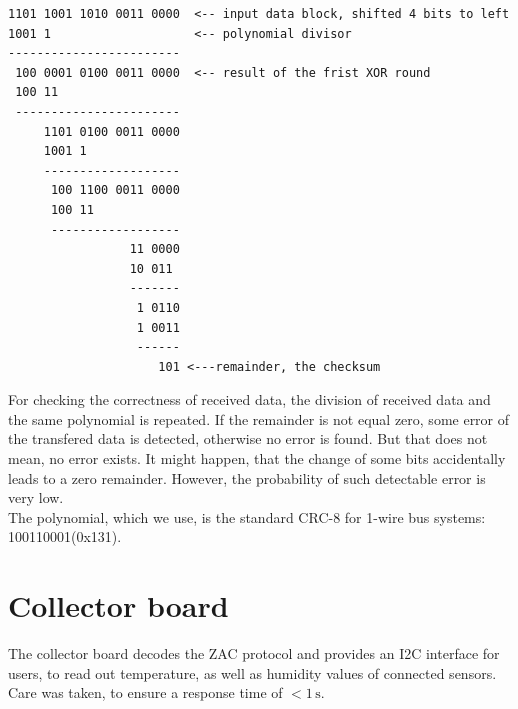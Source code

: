 \documentclass[a4paper]{scrreprt}
\begin{document}
\lstset{style=mathstyle}
\begin{lstlisting}[xleftmargin=25pt, xrightmargin=25pt,framexleftmargin=10pt,framextopmargin=10pt, framexbottommargin=10pt]
1101 1001 1010 0011 0000  <-- input data block, shifted 4 bits to left 
1001 1                    <-- polynomial divisor
------------------------
 100 0001 0100 0011 0000  <-- result of the frist XOR round
 100 11
 -----------------------
     1101 0100 0011 0000
     1001 1
     -------------------
      100 1100 0011 0000
      100 11
      ------------------
                 11 0000
                 10 011
                 -------
                  1 0110
                  1 0011
                  ------
                     101 <---remainder, the checksum
\end{lstlisting}
For checking the correctness of received data, the division of received data and the same polynomial is repeated.
If the remainder is not equal zero, some error of the transfered data is detected, otherwise no error is found.
But that does not mean, no error exists.
It might happen, that the change of some bits accidentally leads to a zero remainder. However, the probability of such detectable error is very low.\\
The polynomial, which we use, is the standard CRC-8 for 1-wire bus systems: 100110001(0x131).
\section{Collector board}
The collector board decodes the ZAC protocol and provides an I2C interface
for users, to read out temperature, as well as humidity values of connected sensors.
Care was taken, to ensure a response time of $<1\,\mathrm{s}$.
\end{document}
